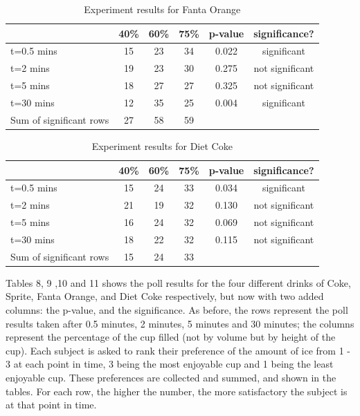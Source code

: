 \documentclass[oneside,12pt]{report}
\begin{document}
\begin{table}[ h]
\centering
\begin{tabular}{ l || c|c|c||c|c }
  &40\% &60\% & 75\% &p-value &significance? \\
\hline  
t=0.5 mins & 15 & 23 & 34&0.022&significant\\ 
\hline  
t=2 mins & 19 & 23 & 30&0.275&not significant\\ 
\hline  
t=5 mins & 18 & 27 & 27&0.325&not significant\\ 
\hline  
t=30 mins & 12 & 35 & 25&0.004&significant\\ 
\hline     
Sum of significant rows & 27 & 58 & 59 & & \\ 
\hline     
 \end{tabular}
\caption{Experiment results for Fanta Orange}

\end{table}

\begin{table}[ h]
\centering
\begin{tabular}{ l || c|c|c||c|c }
  &40\% &60\% & 75\% &p-value &significance? \\
\hline  
t=0.5 mins & 15 & 24 & 33&0.034&significant\\ 
\hline  
t=2 mins & 21& 19 & 32&0.130 &not significant\\ 
\hline  
t=5 mins & 16 & 24 & 32&0.069&not significant\\ 
\hline  
t=30 mins & 18 & 22& 32&0.115&not significant\\ 
\hline  
Sum of significant rows & 15 & 24 & 33 & & \\ 
\hline     
 \end{tabular}
\caption{Experiment results for Diet Coke}
\end{table}


Tables 8, 9 ,10 and 11 shows the poll results for the four different drinks of Coke, Sprite, Fanta Orange, and Diet Coke respectively, but now with two added columns: the p-value, and the significance. As before, the rows represent the poll results taken after 0.5 minutes, 2 minutes, 5 minutes and 30 minutes; the columns represent the percentage of the cup filled (not by volume but by height of the cup). Each subject is asked to rank their preference of the amount of ice from 1 - 3 at each point in time, 3 being the most enjoyable cup and 1 being the least enjoyable cup. These preferences are collected and summed, and shown in the tables. For each row, the higher the number, the more satisfactory the subject is at that point in time. 
\end{document}
